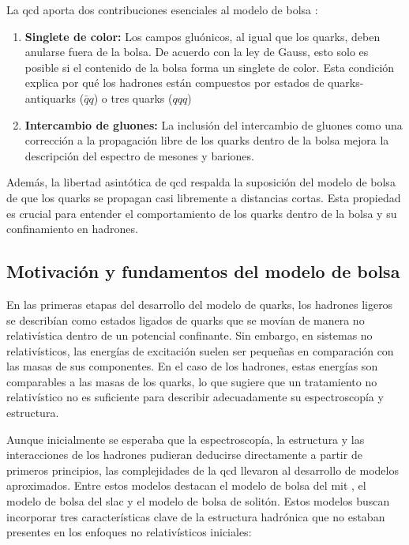 La \gls{qcd} aporta dos contribuciones esenciales al modelo de bolsa \cite{Chodos_1974}:

\begin{enumerate}
\item \textbf{Singlete de color:} Los campos gluónicos, al igual que los quarks, deben anularse fuera de la bolsa. De acuerdo con la ley de Gauss, esto solo es posible si el contenido de la bolsa forma un singlete de color. Esta condición explica por qué los hadrones están compuestos por estados de quarks-antiquarks  ($\bar{q}q$) o tres quarks ($qqq$)
\item \textbf{Intercambio de gluones:} La inclusión del intercambio de gluones como una corrección a la propagación libre de los quarks dentro de la bolsa mejora la descripción del espectro de mesones y bariones.
\end{enumerate}

Además, la libertad asintótica de \gls{qcd} respalda la suposición del modelo de bolsa de que los quarks se propagan casi libremente a distancias cortas. Esta propiedad es crucial para entender el comportamiento de los quarks dentro de la bolsa y su confinamiento en hadrones.

\subsection{Motivación y fundamentos del modelo de bolsa}

En las primeras etapas del desarrollo del modelo de quarks, los hadrones ligeros se describían como estados ligados de quarks que se movían de manera no relativística dentro de un potencial confinante. Sin embargo, en sistemas no relativísticos, las energías de excitación suelen ser pequeñas en comparación con las masas de sus componentes. En el caso de los hadrones, estas energías son comparables a las masas de los quarks, lo que sugiere que un tratamiento no relativístico no es suficiente para describir adecuadamente su espectroscopía y estructura. %

Aunque inicialmente se esperaba que la espectroscopía, la estructura y las interacciones de los hadrones pudieran deducirse directamente a partir de primeros principios, las complejidades de la \gls{qcd} llevaron al desarrollo de modelos aproximados. Entre estos modelos destacan el modelo de bolsa del \gls{mit} %
, el modelo de bolsa del \gls{slac} y el modelo de bolsa de solitón. Estos modelos buscan incorporar tres características clave de la estructura hadrónica que no estaban presentes en los enfoques no relativísticos iniciales:

